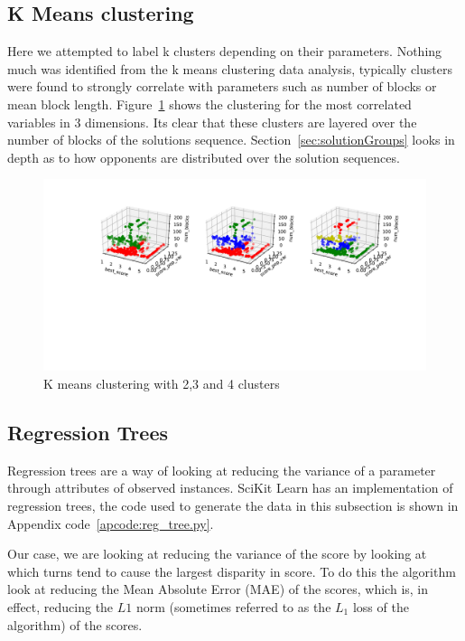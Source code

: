 \subsection{K Means clustering~\cite{bora2014effect}}\label{ssec:k_means}
Here we attempted to label k clusters depending on their parameters.
Nothing much was identified from the k means clustering data analysis, typically clusters were found to strongly correlate with parameters such as number of blocks or mean block length.
Figure~\ref{fig:k_means} shows the clustering for the most correlated variables in 3 dimensions.
Its clear that these clusters are layered over the number of blocks of the solutions sequence.
Section~\ref{sec:solutionGroups} looks in depth as to how opponents are distributed over the solution sequences. 

\begin{figure}[ht]
    \includegraphics[width=1.0\textwidth, center]{./img/descriptive/k_means.pdf}
    \caption{K means clustering with 2,3 and 4 clusters}\label{fig:k_means}
\end{figure}

\subsection{Regression Trees~\cite{breiman2017classification}}
Regression trees are a way of looking at reducing the variance of a parameter through attributes of observed instances. 
SciKit Learn has an implementation of regression trees, the code used to generate the data in this subsection is shown in Appendix code~\ref{apcode:reg_tree.py}.

Our case, we are looking at reducing the variance of the score by looking at which turns tend to cause the largest disparity in score.
To do this the algorithm look at reducing the Mean Absolute Error (MAE) of the scores, which is, in effect, reducing the $L1$ norm (sometimes referred to as the $L_1$ loss of the algorithm) of the scores.

